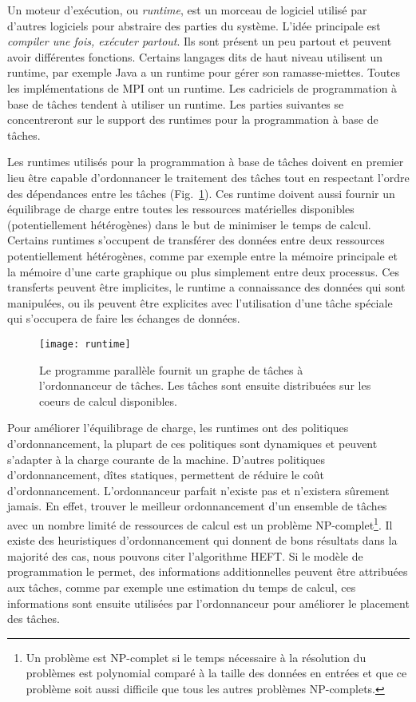 Un moteur d'exécution, ou {\em runtime}, est un morceau de logiciel utilisé par d'autres logiciels pour abstraire des parties du système.
%
L'idée principale est {\em compiler une fois, exécuter partout}.
%
Ils sont présent un peu partout et peuvent avoir différentes fonctions.
%
Certains langages dits de haut niveau utilisent un runtime, par exemple Java a un runtime pour gérer son ramasse-miettes.
%
Toutes les implémentations de MPI ont un runtime.
%
Les cadriciels de programmation à base de tâches tendent à utiliser un runtime.
%
Les parties suivantes se concentreront sur le support des runtimes pour la programmation à base de tâches.


Les runtimes utilisés pour la programmation à base de tâches doivent en premier lieu être capable d'ordonnancer le traitement des tâches tout en respectant l'ordre des dépendances entre les tâches (Fig.~\ref{fig:runtime}).
%
Ces runtime doivent aussi fournir un équilibrage de charge entre toutes les ressources matérielles disponibles (potentiellement hétérogènes) dans le but de minimiser le temps de calcul.
%
Certains runtimes s'occupent de transférer des données entre deux ressources potentiellement hétérogènes, comme par exemple entre la mémoire principale et la mémoire d'une carte graphique ou plus simplement entre deux processus.
%
Ces transferts peuvent être implicites, le runtime a connaissance des données qui sont manipulées, ou ils peuvent être explicites avec l'utilisation d'une tâche spéciale qui s'occupera de faire les échanges de données.

\begin{figure}[t!]
  \centering
  \texttt{[image: runtime]}
  \caption{Le programme parallèle fournit un graphe de tâches à l'ordonnanceur de tâches. Les tâches sont ensuite distribuées sur les coeurs de calcul disponibles.}
  \label{fig:runtime}
\end{figure}


Pour améliorer l'équilibrage de charge, les runtimes ont des politiques d'ordonnancement, la plupart de ces politiques sont dynamiques et peuvent s'adapter à la charge courante de la machine.
%
D'autres politiques d'ordonnancement, dîtes statiques, permettent de réduire le coût d'ordonnancement.
%
L'ordonnanceur parfait n'existe pas et n'existera sûrement jamais.
%
En effet, trouver le meilleur ordonnancement d'un ensemble de tâches avec un nombre limité de ressources de calcul est un problème NP-complet\footnote{Un problème est NP-complet si le temps nécessaire à la résolution du problèmes est polynomial comparé à la taille des données en entrées et que ce problème soit aussi difficile que tous les autres problèmes NP-complets.}.
%
Il existe des heuristiques d'ordonnancement qui donnent de bons résultats dans la majorité des cas, nous pouvons citer l'algorithme HEFT\cite{heft}.
%
Si le modèle de programmation le permet, des informations additionnelles peuvent être attribuées aux tâches, comme par exemple une estimation du temps de calcul, ces informations sont ensuite utilisées par l'ordonnanceur pour améliorer le placement des tâches.


